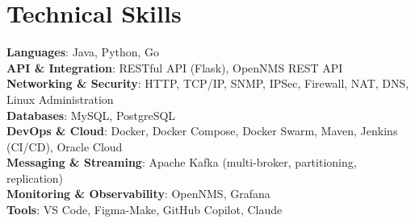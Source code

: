 \section{Technical Skills}
 \begin{itemize}[leftmargin=0.15in, label={}]
    \small{\item{
     \textbf{Languages}{: Java, Python, Go} \\
     \textbf{API \& Integration}{: RESTful API (Flask), OpenNMS REST API} \\
     \textbf{Networking \& Security}{: HTTP, TCP/IP, SNMP, IPSec, Firewall, NAT, DNS, Linux Administration} \\
     \textbf{Databases}{: MySQL, PostgreSQL} \\
     \textbf{DevOps \& Cloud}{: Docker, Docker Compose, Docker Swarm, Maven, Jenkins (CI/CD), Oracle Cloud} \\
     \textbf{Messaging \& Streaming}{: Apache Kafka (multi-broker, partitioning, replication)} \\
     \textbf{Monitoring \& Observability}{: OpenNMS, Grafana} \\
     \textbf{Tools}{: VS Code, Figma-Make, GitHub Copilot, Claude}
    }}
 \end{itemize}
